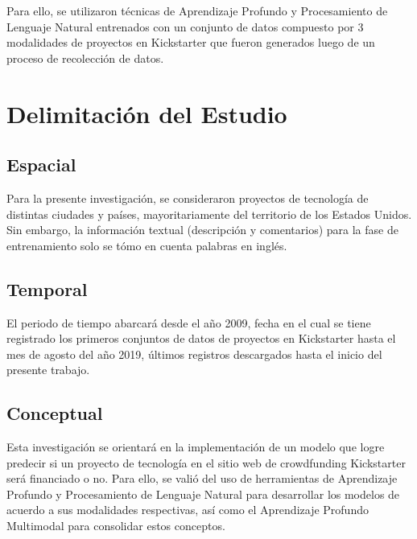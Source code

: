 Para ello, se utilizaron técnicas de Aprendizaje Profundo y Procesamiento de Lenguaje Natural entrenados con un conjunto de datos compuesto por 3 modalidades de proyectos en Kickstarter que fueron generados luego de un proceso de recolección de datos.

\section{Delimitación del Estudio}

\subsection{Espacial}
Para la presente investigación, se consideraron proyectos de tecnología de distintas ciudades y países, mayoritariamente del territorio de los Estados Unidos. Sin embargo, la información textual (descripción y comentarios) para la fase de entrenamiento solo se tómo en cuenta palabras en inglés.

\subsection{Temporal}
El periodo de tiempo abarcará desde el año 2009, fecha en el cual se tiene registrado los primeros conjuntos de datos de proyectos en Kickstarter hasta el mes de agosto del año 2019, últimos registros descargados hasta el inicio del presente trabajo.

\subsection{Conceptual}
Esta investigación se orientará en la implementación de un modelo que logre predecir si un proyecto de tecnología en el sitio web de crowdfunding Kickstarter será financiado o no. Para ello, se valió del uso de herramientas de Aprendizaje Profundo y Procesamiento de Lenguaje Natural para desarrollar los modelos de acuerdo a sus modalidades respectivas, así como el Aprendizaje Profundo Multimodal para consolidar estos conceptos.